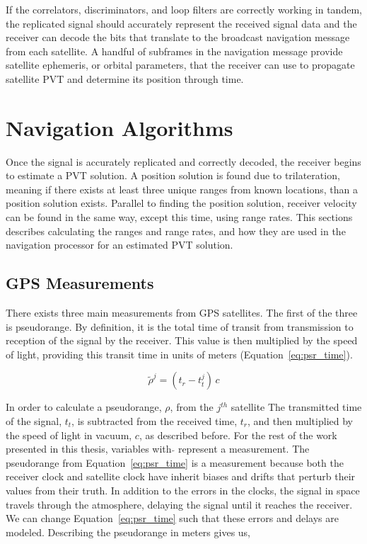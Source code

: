 If the correlators, discriminators, and loop filters are correctly working in tandem, the replicated signal should accurately represent the received signal data and the receiver can decode the bits that translate to the broadcast navigation message from each satellite. A handful of subframes in the navigation message provide satellite ephemeris, or orbital parameters, that the receiver can use to propagate satellite PVT and determine its position through time.

\section{Navigation Algorithms}
Once the signal is accurately replicated and correctly decoded, the receiver begins to estimate a PVT solution. A position solution is found due to trilateration, meaning if there exists at least three unique ranges from known locations, than a position solution exists. Parallel to finding the position solution, receiver velocity can be found in the same way, except this time, using range rates. This sections describes calculating the ranges and range rates, and how they are used in the navigation processor for an estimated PVT solution.

\subsection{GPS Measurements}
There exists three main measurements from GPS satellites. The first of the three is pseudorange. By definition, it is the total time of transit from transmission to reception of the signal by the receiver. This value is then multiplied by the speed of light, providing this transit time in units of meters (Equation~\ref{eq:psr_time}).

\begin{equation}\label{eq:psr_time}
    \tilde{\rho}^j = (t_r - t_t^j)\,c
\end{equation}

In order to calculate a pseudorange, \(\rho \), from the \(j^{th}\) satellite The transmitted time of the signal, \(t_t\), is subtracted from the received time, \(t_r\), and then multiplied by the speed of light in vacuum, \(c\), as described before. For the rest of the work presented in this thesis, variables with \(\tilde{}\) represent a measurement. The pseudorange from Equation~\ref{eq:psr_time} is a measurement because both the receiver clock and satellite clock have inherit biases and drifts that perturb their values from their truth. In addition to the errors in the clocks, the signal in space travels through the atmosphere, delaying the signal until it reaches the receiver. We can change Equation~\ref{eq:psr_time} such that these errors and delays are modeled. Describing the pseudorange in meters gives us,

